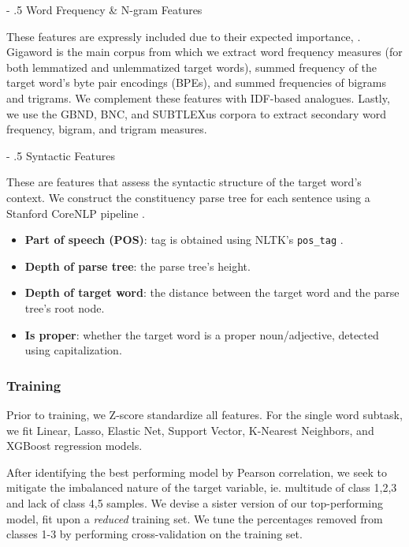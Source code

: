 \documentclass[11pt,a4paper]{article}
\makeatletter
\renewcommand\paragraph{%
    \@startsection{paragraph}{4}{0mm}%
        {-\baselineskip}%
        {.5\baselineskip}%
        {\normalfont\normalsize\bfseries}}
\makeatother
\begin{document}
\paragraph{Word Frequency \& N-gram Features}

These features are expressly included due to their expected importance, \citep{zampieriEtAl:2017:NLPTEA}. Gigaword is the main corpus from which we extract word frequency measures (for both lemmatized and unlemmatized target words), summed frequency of the target word's byte pair encodings (BPEs), and summed frequencies of bigrams and trigrams. We complement these features with IDF-based analogues. Lastly, we use the GBND, BNC, and SUBTLEXus corpora to extract secondary word frequency, bigram, and trigram measures. 

\paragraph{Syntactic Features}

These are features that assess the syntactic structure of the target word's context. We construct the constituency parse tree for each sentence using a Stanford CoreNLP pipeline \citep{manning-EtAl:2014:P14-5}.

\begin{itemize}
  \item \textbf{Part of speech (POS)}: tag is obtained using NLTK's \texttt{pos\_tag} \citep{Loper02nltk:the}.
  \item \textbf{Depth of parse tree}: the parse tree's height.
  \item \textbf{Depth of target word}: the distance between the target word and the parse tree's root node.
  \item \textbf{Is proper}: whether the target word is a proper noun/adjective, detected using capitalization.
\end{itemize}

\subsubsection{Training}

Prior to training, we Z-score standardize all features. For the single word subtask, we fit Linear, Lasso, Elastic Net, Support Vector, K-Nearest Neighbors, and XGBoost regression models. 

After identifying the best performing model by Pearson correlation, we seek to mitigate the imbalanced nature of the target variable, ie. multitude of class 1,2,3 and lack of class 4,5 samples. We devise a sister version of our top-performing model, fit upon a \textit{reduced} training set. We tune the percentages removed from classes 1-3 by performing cross-validation on the training set.
\end{document}
